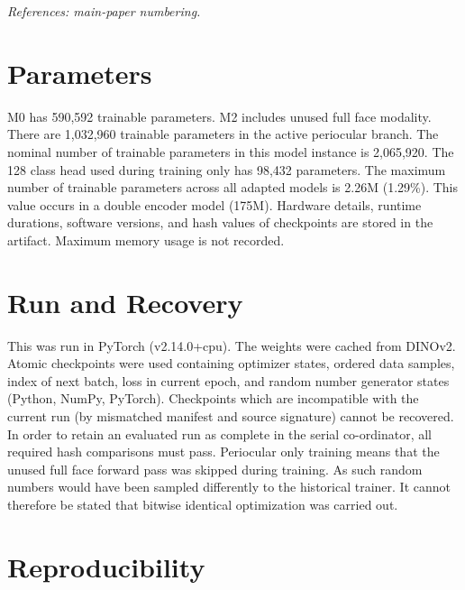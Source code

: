\noindent\textit{References: main-paper numbering.}\par

\section{Parameters}

M0 has 590,592 trainable parameters. M2 includes unused full face modality. There are 1,032,960 trainable parameters in the active periocular branch. The nominal number of trainable parameters in this model instance is 2,065,920. The 128 class head used during training only has 98,432 parameters. The maximum number of trainable parameters across all adapted models is 2.26M (1.29\%). This value occurs in a double encoder model (175M). Hardware details, runtime durations, software versions, and hash values of checkpoints are stored in the artifact. Maximum memory usage is not recorded.\par

\section{Run and Recovery}

This was run in PyTorch (v2.14.0+cpu). The weights were cached from DINOv2. Atomic checkpoints were used containing optimizer states, ordered data samples, index of next batch, loss in current epoch, and random number generator states (Python, NumPy, PyTorch). Checkpoints which are incompatible with the current run (by mismatched manifest and source signature) cannot be recovered. In order to retain an evaluated run as complete in the serial co-ordinator, all required hash comparisons must pass. Periocular only training means that the unused full face forward pass was skipped during training. As such random numbers would have been sampled differently to the historical trainer. It cannot therefore be stated that bitwise identical optimization was carried out.\par

\section{Reproducibility}

